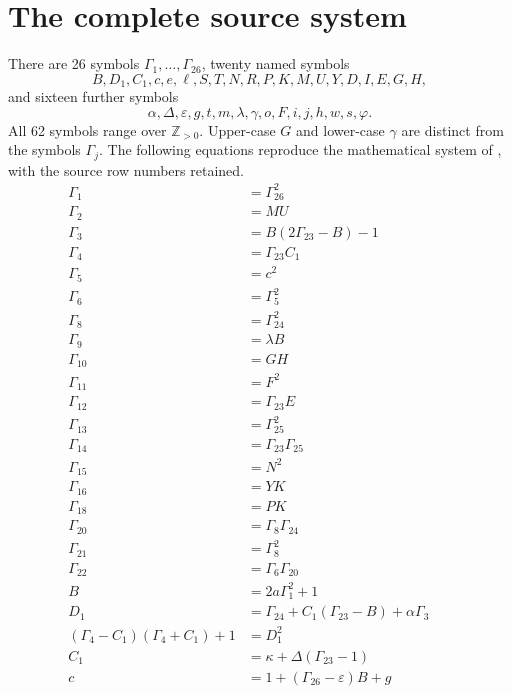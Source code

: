 \documentclass[11pt]{article}
\newcommand{\Np}{\mathbb Z_{>0}}
\begin{document}
\section{The complete source system}
There are 26 symbols \(\Gamma_1,\ldots,\Gamma_{26}\), twenty named symbols
\[
B,D_1,C_1,c,e,\ell,S,T,N,R,P,K,M,U,Y,D,I,E,G,H,
\]
and sixteen further symbols
\[
\alpha,\Delta,\varepsilon,g,t,m,\lambda,\gamma,o,F,i,j,h,w,s,\varphi.
\]
All 62 symbols range over \(\Np\). Upper-case \(G\) and lower-case
\(\gamma\) are distinct from the symbols \(\Gamma_j\).
The following equations reproduce the mathematical system of \cite{MT},
with the source row numbers retained.
\allowdisplaybreaks
\begin{align}
\Gamma_1&=\Gamma_{26}^{2} &&\tag{8}\\
\Gamma_2&=MU &&\tag{9}\\
\Gamma_3&=B(2\Gamma_{23}-B)-1 &&\tag{10}\\
\Gamma_4&=\Gamma_{23}C_1 &&\tag{11}\\
\Gamma_5&=c^2 &&\tag{12}\\
\Gamma_6&=\Gamma_5^2 &&\tag{13}\\
\Gamma_8&=\Gamma_{24}^2 &&\tag{14}\\
\Gamma_9&=\lambda B &&\tag{15}\\
\Gamma_{10}&=GH &&\tag{16}\\
\Gamma_{11}&=F^2 &&\tag{17}\\
\Gamma_{12}&=\Gamma_{23}E &&\tag{18}\\
\Gamma_{13}&=\Gamma_{25}^2 &&\tag{19}\\
\Gamma_{14}&=\Gamma_{23}\Gamma_{25} &&\tag{20}\\
\Gamma_{15}&=N^2 &&\tag{21}\\
\Gamma_{16}&=YK &&\tag{22}\\
\Gamma_{18}&=PK &&\tag{23}\\
\Gamma_{20}&=\Gamma_8\Gamma_{24} &&\tag{24}\\
\Gamma_{21}&=\Gamma_8^2 &&\tag{25}\\
\Gamma_{22}&=\Gamma_6\Gamma_{20} &&\tag{26}\\
B&=2a\Gamma_1^2+1 &&\tag{27}\\
D_1&=\Gamma_{24}+C_1(\Gamma_{23}-B)+\alpha\Gamma_3 &&\tag{28}\\
(\Gamma_4-C_1)(\Gamma_4+C_1)+1&=D_1^2 &&\tag{29}\\
C_1&=\kappa+\Delta(\Gamma_{23}-1) &&\tag{30}\\
c&=1+(\Gamma_{26}-\varepsilon)B+g &&\tag{31}\\

\end{align}
\end{document}
